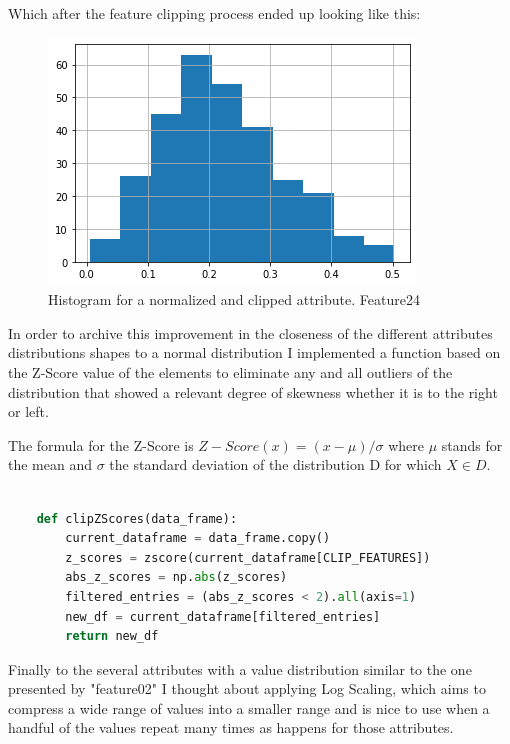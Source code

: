 \documentclass[12pt, a4paper]{article}
\begin{document}
	Which after the feature clipping process ended up looking like this:
	
	\begin{figure}[H]
		\label{Feature24NC}
		\includegraphics{img/plots/feature24NClip.png}
		\caption{Histogram for a normalized and clipped attribute. Feature24}
	\end{figure}

	In order to archive this improvement in the closeness of the different attributes distributions shapes to a normal distribution I implemented a function based on the Z-Score value of the elements to eliminate any and all outliers of the distribution that showed a relevant degree of skewness whether it is to the right or left.
	
	The formula for the Z-Score is $ Z-Score(x) = (x - \mu)/\sigma $ where $\mu$ stands for the mean and $\sigma$ the standard deviation of the distribution D for which $X \in D$.\cite{datascienceZscore}
	
	\vspace{5mm}
	
	\begin{lstlisting}[language=Python]
		
	def clipZScores(data_frame):
		current_dataframe = data_frame.copy()
		z_scores = zscore(current_dataframe[CLIP_FEATURES])
		abs_z_scores = np.abs(z_scores)
		filtered_entries = (abs_z_scores < 2).all(axis=1)
		new_df = current_dataframe[filtered_entries]
		return new_df
	\end{lstlisting}

	Finally to the several attributes with a value distribution similar to the one presented by "feature02" I thought about applying Log Scaling, which aims to compress a wide range of values into a smaller range and is nice to use when a handful of the values repeat many times as happens for those attributes.\cite{normalizationTechniques}
	
\end{document}
